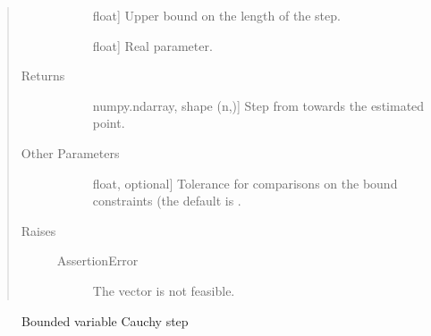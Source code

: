 \documentclass[letterpaper,10pt,english]{sphinxmanual}
\begin{document}
\begin{fulllineitems}
\begin{quote}
\begin{description}
\begin{description}
\item[{}] \leavevmode{[}float{]}
\sphinxAtStartPar
Upper bound on the length of the step.

\item[{}] \leavevmode{[}float{]}
\sphinxAtStartPar
Real parameter.

\end{description}

\item[{Returns}] \leavevmode\begin{description}
\item[{}] \leavevmode{[}numpy.ndarray, shape (n,){]}
\sphinxAtStartPar
Step from  towards the estimated point.

\end{description}

\item[{Other Parameters}] \leavevmode\begin{description}
\item[{}] \leavevmode{[}float, optional{]}
\sphinxAtStartPar
Tolerance for comparisons on the bound constraints (the default is
.

\end{description}

\item[{Raises}] \leavevmode\begin{description}
\item[{AssertionError}] \leavevmode
\sphinxAtStartPar
The vector  is not feasible.

\end{description}

\end{description}\end{quote}


\nopagebreak

\begin{description}
\item[{{\hyperref[\detokenize{refs/generated/cobyqa.linalg.bvcs:cobyqa.linalg.bvcs}]{}}}] \leavevmode
\sphinxAtStartPar
Bounded variable Cauchy step

\end{description}



\end{fulllineitems}
\end{document}
